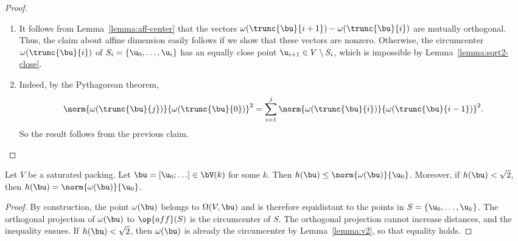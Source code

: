 \begin{proof}
\begin{enumerate}
\item{}
  It follows from Lemma~\ref{lemma:aff-center} that the vectors
  ${\omega(\trunc{\bu}{i+1})}-{\omega(\trunc{\bu}{i})}$ are mutually
  orthogonal.  Thus, the claim about affine dimension easily follows
  if we show that these vectors are nonzero.
Otherwise, the
circumcenter $\omega(\trunc{\bu}{i})$ of $S_i=\{\u_0,\ldots,\u_i\}$
has an equally close point $ \u_{i+1}\in V\setminus S_i$, which is
impossible by Lemma~\ref{lemma:sqrt2-close}.

\item{}  
Indeed, by the Pythagorean theorem,
\begin{equation} 
\norm{\omega(\trunc{\bu}{j})}{\omega(\trunc{\bu}{0})}^2 =
\sum_{i=1}^{j} \norm{\omega(\trunc{\bu}{i})}{\omega(\trunc{\bu}{i-1})}^2.
\end{equation}
So the result follows from the
previous claim.
\end{enumerate}
\end{proof}



\begin{lemma}\label{lemma:h-omega}
  Let $V$ be a saturated packing.  Let $\bu =[\u_0;\ldots]\in
  \bV(k)$ for some $k$.  Then $h(\bu)\le
  \norm{\omega(\bu)}{\u_0}$.  Moreover, if $h(\bu)<\sqrt2$, then
  $h(\bu)=\norm{\omega(\bu)}{\u_0}$.
\end{lemma}

\begin{proof} By construction, the point $\omega(\bu)$ belongs to
  $\Omega(V,\bu)$ and is therefore equidistant to the points in
  $S=\{\u_0,\ldots,\u_k\}$.  The orthogonal projection of
  $\omega(\bu)$ to $\op{aff}(S)$ is the circumcenter of $S$.  The
  orthogonal projection cannot increase distances, and the inequality
  ensues.  If $h(\bu)<\sqrt2$, then $\omega(\bu)$ is already the
  circumcenter by Lemma~\ref{lemma:v2}, so that equality holds.
\end{proof}

